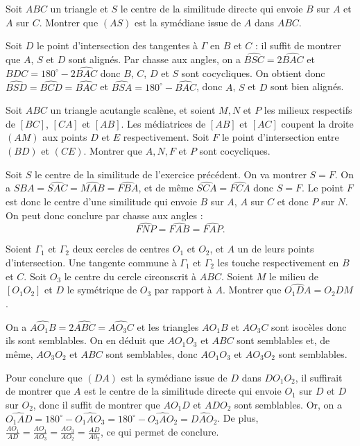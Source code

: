 \begin{exo}
Soit $ABC$ un triangle et $S$ le centre de la similitude directe qui envoie $B$ sur $A$ et $A$ sur $C$. Montrer que $(AS)$ est la symédiane issue de $A$ dans $ABC$.
\end{exo}

\begin{sol}
Soit $D$ le point d'intersection des tangentes à $\Gamma$ en $B$ et $C$ : il suffit de montrer que $A$, $S$ et $D$ sont alignés. Par chasse aux angles, on a $\widehat{BSC}=2 \widehat{BAC}$ et $BDC=180^{\circ} - 2 \widehat{BAC}$ donc $B$, $C$, $D$ et $S$ sont cocycliques. On obtient donc $\widehat{BSD}=\widehat{BCD}=\widehat{BAC}$ et $\widehat{BSA}=180^{\circ}-\widehat{BAC}$, donc $A$, $S$ et $D$ sont bien alignés.
\end{sol}

\begin{exo}
 Soit $ABC$ un triangle acutangle scal\`ene, et soient $M,N$ et $P$ les milieux respectifs de
$[BC]$, $[CA]$ et $[AB]$. Les m\'ediatrices de $[AB]$ et $[AC]$ coupent la droite $(AM)$ aux
points $D$ et $E$ respectivement. Soit $F$ le point d'intersection entre $(BD)$ et $(CE)$.
Montrer que $A,N,F$ et $P$ sont cocycliques.
\end{exo}

\begin{sol}
Soit $S$ le centre de la similitude de l'exercice précédent. On va montrer $S=F$. On a ${SBA}=\widehat{SAC}=\widehat{MAB}=\widehat{FBA}$, et de même $\widehat{SCA}=\widehat{FCA}$ donc $S=F$. Le point $F$ est donc le centre d'une similitude qui envoie $B$ sur $A$, $A$ sur $C$ et donc $P$ sur $N$. On peut donc conclure par chasse aux angles :
\[\widehat{FNP}=\widehat{FAB}=\widehat{FAP}.\]
\end{sol}

\begin{exo}
Soient $\Gamma_1$ et $\Gamma_2$ deux cercles de centres $O_1$ et $O_2$, et $A$ un de leurs points d'intersection. Une tangente commune à $\Gamma_1$ et $\Gamma_2$ les touche respectivement en $B$ et $C$. Soit $O_3$ le centre du cercle circonscrit à $ABC$. Soient $M$ le milieu de $[O_1 O_2]$ et $D$ le symétrique de $O_3$ par rapport à $A$. Montrer que $\widehat{O_1 DA}=\widehat{O_2 DM}$.
\end{exo}

\begin{sol}
On a $\widehat{AO_1 B}=2 \widehat{ABC}=\widehat{AO_3 C}$ et les triangles $AO_1B$ et $AO_3 C$ sont isocèles donc ils sont semblables. On en déduit que $AO_1 O_3$ et $ABC$ sont semblables et, de même, $AO_3 O_2$ et $ABC$ sont semblables, donc $AO_1 O_3$ et $AO_3 O_2$ sont semblables.

Pour conclure que $(DA)$ est la symédiane issue de $D$ dans $DO_1 O_2$, il suffirait de montrer que $A$ est le centre de la similitude directe qui envoie $O_1$ sur $D$ et $D$ sur $O_2$, donc il suffit de montrer que $AO_1 D$ et $ADO_2$ sont semblables. Or, on a $\widehat{O_1 AD}=180^{\circ}-\widehat{O_1 A O_3}=180^{\circ}-\widehat{O_3 A O_2}=\widehat{DAO_2}$. De plus, $\frac{AO_1}{AD}=\frac{AO_1}{AO_3}=\frac{AO_3}{AO_2}=\frac{AD}{A0_2}$, ce qui permet de conclure.
\end{sol}

